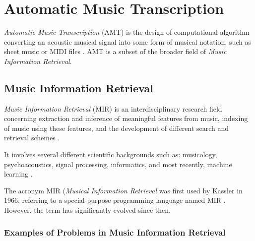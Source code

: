 \chapter{Automatic Music Transcription}

\emph{Automatic Music Transcription} (AMT) is the design of computational algorithm converting an acoustic musical signal into some form of musical notation, such as sheet music or MIDI files \cite{Benetos2019}. AMT is a subset of the broader field of \emph{Music Information Retrieval}.

\section{Music Information Retrieval}

\emph{Music Information Retrieval} (MIR) is an interdisciplinary research field concerning extraction and inference of meaningful features from music, indexing of music using these features, and the development of different search and retrieval schemes \cite{Schedl2014}.

It involves several different scientific backgrounds such as: musicology, psychoacoustics, signal processing, informatics, and most recently, machine learning \cite{Wiki2024A}.

The acronym MIR (\emph{Musical Information Retrieval} was first used by Kassler in 1966, referring to a special-purpose programming language named MIR \cite{Kassler1966}. However, the term has significantly evolved since then.

\subsection{Examples of Problems in Music Information Retrieval}

